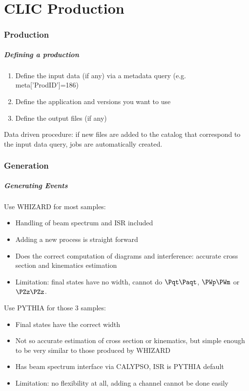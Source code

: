 \documentclass{beamer}
\begin{document}
\part{CLIC Production}
\begin{frame}
\partpage 
\end{frame}

\section{Production}
\begin{frame}
\frametitle{Defining a production} 
\begin{enumerate}
\item Define the input data (if any) via a metadata query (e.g. meta['ProdID']=186)
\item Define the application and versions you want to use
\item Define the output files (if any)
\end{enumerate}
\alert{Data driven procedure}: if new files are added to the catalog that correspond to the input data query, jobs are automatically created.
\end{frame}


\section{Generation}
\begin{frame}
\frametitle{Generating Events}
Use WHIZARD for most samples:
\begin{itemize}
\item Handling of \alert{beam spectrum and ISR included}
\item Adding a \alert{new process} is straight forward
\item Does the correct computation of diagrams and interference: \alert{accurate cross section and kinematics estimation}
\item Limitation: \alert{final states have no width}, cannot do $\Pqt\Paqt$, $\PWp\PWm$ or $\PZz\PZz$.
\end{itemize} 
Use PYTHIA for those 3 samples:
\begin{itemize}
\item Final states have the correct width
\item Not so accurate estimation of cross section or kinematics, but simple enough to be very similar to those produced by WHIZARD
\item Has \alert{beam spectrum interface via CALYPSO}, ISR is PYTHIA default
\item Limitation: \alert{no flexibility at all}, adding a channel cannot be done easily
\end{itemize}
\end{frame}
\end{document}
